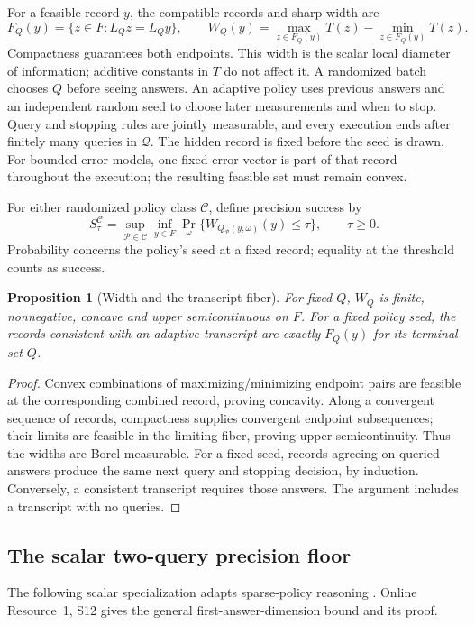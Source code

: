 \documentclass[12pt]{article}
\newtheorem{proposition}{Proposition}
\begin{document}
For a feasible record $y$, the compatible records and sharp width are
\begin{equation}
 F_Q(y)=\{z\in F:L_Qz=L_Qy\},\qquad
 W_Q(y)=\max_{z\in F_Q(y)}T(z)-\min_{z\in F_Q(y)}T(z).
 \label{eq:risk_fiber}
\end{equation}
Compactness guarantees both endpoints. This width is the scalar local
diameter of information; additive constants in $T$ do not affect it.
A randomized batch chooses $Q$ before seeing answers. An adaptive policy
uses previous answers and an independent random seed to choose later
measurements and when to stop. Query and stopping rules are jointly
measurable, and every execution ends after finitely many queries in
$\mathcal Q$. The hidden record is fixed before the seed is drawn.
For bounded-error models, one fixed error vector is part of that record
throughout the execution; the resulting feasible set must remain convex.

For either randomized policy class $\mathcal C$, define precision success by
\begin{equation}
 S_\tau^{\mathcal C}
 =\sup_{\mathcal P\in\mathcal C}\inf_{y\in F}
   \Pr_\omega\{W_{Q_{\mathcal P}(y,\omega)}(y)\leq\tau\},
 \qquad \tau\geq0.
 \label{eq:risk_precision_success}
\end{equation}
Probability concerns the policy's seed at a fixed record; equality at the
threshold counts as success.

\begin{proposition}[Width and the transcript fiber]
\label{prop:risk_concavity_transcript}
For fixed $Q$, $W_Q$ is finite, nonnegative, concave and upper
semicontinuous on $F$. For a fixed policy seed, the records consistent
with an adaptive transcript are exactly $F_Q(y)$ for its terminal set $Q$.
\end{proposition}
\begin{proof}
Convex combinations of maximizing/minimizing endpoint pairs are feasible
at the corresponding combined record, proving concavity. Along a
convergent sequence of records, compactness supplies convergent endpoint
subsequences; their limits are feasible in the limiting fiber, proving
upper semicontinuity. Thus the widths are Borel measurable. For a fixed
seed, records agreeing on queried answers produce the same next query
and stopping decision, by induction. Conversely, a consistent transcript
requires those answers. The argument includes a transcript with no queries.
\end{proof}
\subsection{The scalar two-query precision floor}
The following scalar specialization adapts sparse-policy reasoning
\citep[Theorem~2 and Example~5]{kurtz2026}. Online Resource~1, S12 gives
the general first-answer-dimension bound and its proof.
\end{document}
